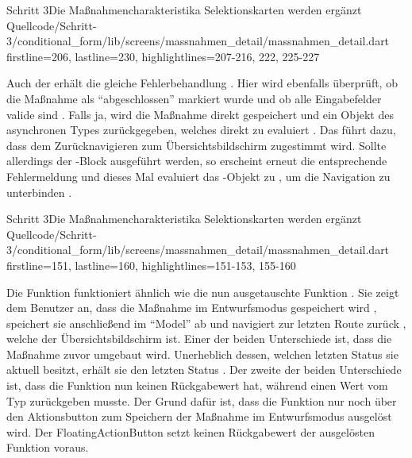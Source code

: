 \begin{alexlisting}{Schritt 3}{Die Maßnahmencharakteristika Selektionskarten werden ergänzt}
    {Quellcode/Schritt-3/conditional_form/lib/screens/massnahmen_detail/massnahmen_detail.dart}
    {firstline=206, lastline=230, highlightlines={207-216, 222, 225-227}}
    \label{lst:Schritt3FloatingActionButton}
\end{alexlisting} 

Auch der  erhält die gleiche Fehlerbehandlung \Lst{\ref{lst:Schritt3onWillPop}}. Hier wird ebenfalls überprüft, ob die Maßnahme als \enquote{abgeschlossen} markiert wurde und ob alle Eingabefelder valide sind . Falls ja, wird die Maßnahme direkt gespeichert und ein Objekt des asynchronen Types  zurückgegeben, welches direkt zu  evaluiert . Das führt dazu, dass dem Zurücknavigieren zum Übersichtsbildschirm zugestimmt wird. Sollte allerdings der -Block ausgeführt werden, so erscheint erneut die entsprechende Fehlermeldung  und dieses Mal evaluiert das -Objekt zu , um die Navigation zu unterbinden .

\begin{alexlisting}{Schritt 3}{Die Maßnahmencharakteristika Selektionskarten werden ergänzt}
    {Quellcode/Schritt-3/conditional_form/lib/screens/massnahmen_detail/massnahmen_detail.dart}
    {firstline=151, lastline=160, highlightlines={151-153, 155-160}}
    \label{lst:Schritt3onWillPop}
\end{alexlisting}

Die Funktion  funktioniert ähnlich wie die nun ausgetauschte Funktion .
Sie zeigt dem Benutzer an, dass die Maßnahme im Entwurfsmodus gespeichert wird , speichert sie anschließend im \enquote{Model} ab  und navigiert zur letzten Route zurück , welche der Übersichtsbildschirm ist.  Einer der beiden Unterschiede ist, dass die Maßnahme zuvor umgebaut wird. Unerheblich dessen, welchen letzten Status sie aktuell besitzt, erhält sie den letzten Status  . Der zweite der beiden Unterschiede ist, dass die Funktion nun keinen Rückgabewert hat, während  einen Wert vom Typ  zurückgeben musste. Der Grund dafür ist, dass die Funktion nur noch über den Aktionsbutton zum Speichern der Maßnahme im Entwurfsmodus ausgelöst wird. Der FloatingActionButton setzt keinen Rückgabewert der ausgelösten Funktion voraus.

